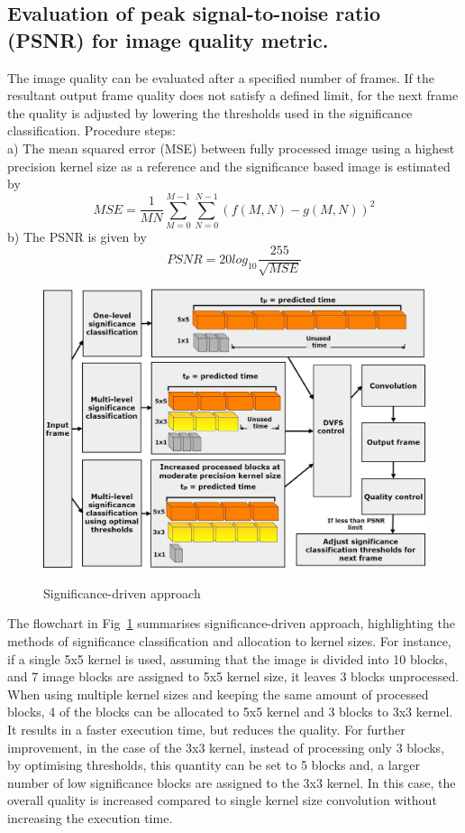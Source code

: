 \documentclass[journal]{IEEEtran}
\begin{document}
\subsection{Evaluation of peak signal-to-noise ratio (PSNR) for image quality metric.} 

The image quality can be evaluated after a specified number of frames. If the resultant output frame quality does not satisfy a defined limit, for the next frame the quality is adjusted by lowering the thresholds used in the significance classification. Procedure steps: \\
a)	The mean squared error (MSE) between fully processed image using a highest precision kernel size as a reference and the significance based image is estimated by 
\indent \[MSE = \frac{1}{MN} \sum_{M=0}^{M-1} \sum_{N=0}^{N-1} (f(M,N)-g(M,N))^2 \] 
b)	The PSNR is given by 
\indent \[ PSNR = 20 log_{10} \frac{255}{\sqrt{MSE}} \] 
\begin{figure}[htbp]
  \centering
    \caption{Significance-driven approach }
    \includegraphics[width=\columnwidth]{SignificanceApproach.jpg}
  \label{fig:SigApp2}
\end{figure}
The flowchart in Fig~\ref{fig:SigApp2} summarises significance-driven approach, highlighting the methods of significance classification and allocation to kernel sizes. For instance, if a single 5x5 kernel is used, assuming that the image is divided into 10 blocks, and 7 image blocks are assigned to 5x5 kernel size, it leaves 3 blocks unprocessed. When using multiple kernel sizes and keeping the same amount of processed blocks, 4 of the blocks can be allocated to 5x5 kernel and 3 blocks to 3x3 kernel. It results in a faster execution time, but reduces the quality. For further improvement, in the case of the 3x3 kernel, instead of processing only 3 blocks, by optimising thresholds, this quantity can be set  to 5 blocks and, a larger number of low significance blocks are assigned to the 3x3 kernel.  In this case, the overall quality is increased compared to single kernel size convolution without increasing the execution time.
\end{document}
